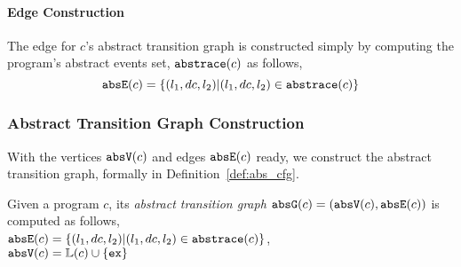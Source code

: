   \paragraph{Edge Construction}
The edge for $c$'s abstract transition graph is constructed simply by computing the program's abstract events set, $\mathtt{abs}{\mathtt{trace}}(c)$ as follows,
  \[
    \mathtt{abs}{\mathtt{E}}(c) = \{(l_1, dc, l_2) | (l_1, dc, l_2) \in \mathtt{abs}{\mathtt{trace}}(c)\}
  \]
%
\subsubsection{Abstract Transition Graph Construction} 
With the vertices $\mathtt{abs}{\mathtt{V}}(c)$ and edges $\mathtt{abs}{\mathtt{E}}(c)$ ready, we construct the abstract transition graph, formally in
Definition~\ref{def:abs_cfg}.
%
\begin{defn}
\label{def:abs_cfg}
Given a program $c$, 
its \emph{abstract transition graph} $\mathtt{abs}{\mathtt{G}}(c) =(\mathtt{abs}{\mathtt{V}}(c), \mathtt{abs}{\mathtt{E}}(c))$ is computed as follows,
\\
$\mathtt{abs}{\mathtt{E}}(c) = \{(l_1, dc, l_2) | (l_1, dc, l_2) \in \mathtt{abs}{\mathtt{trace}}(c)\}$,
\\
$\mathtt{abs}{\mathtt{V}}(c) = \mathbb{L}(c)\cup\{\mathtt{ex}\}$
\end{defn}
%
